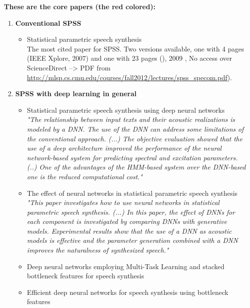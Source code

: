 \textbf{\Large These are the core papers (the red colored):}
\begin{enumerate}[leftmargin=16pt]
	\item \textbf{Conventional \ac{SPSS}}
	\begin{itemize}[leftmargin=10pt]
		\item \textcolor{ACMRed}{Statistical parametric speech synthesis} \cite{zen:statistical}\\
		The most cited paper for \ac{SPSS}. Two versions available, one with 4 pages (IEEE Xplore, 2007) and one with 23 pages ()\cite{zen:statistical}, 2009 , No access over ScienceDirect --> PDF from \url{http://mlsp.cs.cmu.edu/courses/fall2012/lectures/spss_specom.pdf}).
	\end{itemize}
	\vspace{1em}
	\item \textbf{\ac{SPSS} with deep learning in general}
	\begin{itemize}[leftmargin=10pt]
		\item \textcolor{ACMRed}{Statistical parametric speech synthesis using deep neural networks} \cite{zen:deepstatistical}\\
		\textit{"The relationship between input texts and their acoustic realizations is modeled by a DNN. The use of the DNN can address some limitations of the conventional approach. (...) The objective evaluation showed that the use of a deep architecture improved the performance of the neural network-based system for predicting spectral and excitation parameters. (..) One of the advantages of the HMM-based system over the DNN-based one is the reduced computational cost."}
		\item \textcolor{ACMRed}{The effect of neural networks in statistical parametric speech synthesis} \cite{hashimoto:effect}\\
		\textit{"This paper investigates how to use neural networks in statistical parametric speech synthesis. (...) In this paper, the effect of DNNs for each component is investigated by comparing DNNs with generative models. Experimental results show that the use of a DNN as acoustic models is effective and the parameter generation combined with a DNN improves the naturalness of synthesized speech."}
		\item \textcolor{black!40}{Deep neural networks employing Multi-Task Learning and stacked bottleneck features for speech synthesis \cite{wu:deep}}
		\item \textcolor{black!40}{Efficient deep neural networks for speech synthesis using bottleneck features \cite{joo:efficient}}

\end{itemize}
\end{enumerate}

